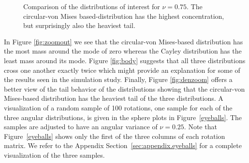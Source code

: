 
\begin{figure}[h!]
\centering
{}
\caption{Comparison of the distributions of interest for $\nu=0.75$.  The circular-von Mises based-distribution has the highest concentration, but surprisingly also the heaviest tail.}
\label{fig:Haar}
\end{figure}

In Figure \ref{fig:zoomout} we see that the circular-von Mises-based distribution has the most mass around the mode of zero whereas the Cayley distribution has the least mass around its mode.  Figure \ref{fig:body} suggests that all three distributions cross one another exactly twice which might provide an explanation for some of the results seen in the simulation study. Finally, Figure \ref{fig:denzoom} offers a better view of the tail behavior of the distributions showing that the circular-von Mises-based distribution has the heaviest tail of the three distributions. 
A visualization of a random sample of 100 rotations, one sample for each of the three angular distributions, is given in the sphere plots in Figure~\ref{eyeballs}. The samples are adjusted to have an angular variance of $\nu = 0.25$.  Note that Figure~\ref{eyeballs} shows only the first of the three columns of each rotation matrix. We refer to the Appendix Section~\ref{sec:appendix.eyeballs} for a complete visualization of the three samples.

